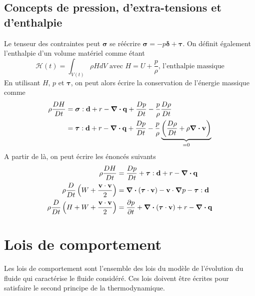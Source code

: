 \documentclass[a4paper,11pt]{report}
\newcommand{\bs}[1]{\boldsymbol{#1}}
\newcommand{\dvm}[2]{\frac{D #1}{D #2}}
\begin{document}
      \subsection{Concepts de pression, d'extra-tensions et d'enthalpie}
        Le tenseur des contraintes peut $\bs{\sigma}$ se réécrire $\bs{\sigma} = -p \bs{\delta} + \bs{\tau}$. On définit également l'enthalpie d'un volume matériel comme étant
        \begin{equation}
          \mathcal{H}(t) = \int_{V(t)} \rho H dV \textrm{ avec } H = U + \frac{p}{\rho}\textrm{, l'enthalpie massique}
        \end{equation}
        En utilisant $H$, $p$ et $\bs{\tau}$, on peut alors écrire la conservation de l'énergie massique comme
        \begin{align}
          \rho \dvm{H}{t} &= \bs{\sigma} : \vb{d} + r - \div \vb{q} +  \dvm{p}{t} - \frac{p}{\rho}\dvm{\rho}{t}\nonumber\\
          &= \bs{\tau} : \vb{d} + r - \div \vb{q} + \dvm{p}{t} - \frac{p}{\rho} \underbrace{\left(\dvm{\rho}{t} + \rho \div \vb{v} \right)}_{=0}
        \end{align}
        A partir de là, on peut écrire les énoncés suivants
        \begin{equation}\begin{aligned}
          \rho \dvm{H}{t} &= \dvm{p}{t} + \bs{\tau} : \vb{d} + r - \div \vb{q}\\
          \rho \dvm{}{t}\left(W + \frac{\vb{v}\cdot\vb{v}}{2}\right) &= \div (\bs{\tau} \cdot \vb{v}) - \vb{v} \cdot \grad p - \bs{\tau} : \vb{d} \\
          \rho \dvm{}{t}\left(H + W + \frac{\vb{v}\cdot\vb{v}}{2}\right) &= \pdv{p}{t} + \div (\bs{\tau} \cdot \vb{v}) + r - \div \vb{q}
        \end{aligned}\end{equation}

    \section{Lois de comportement}
      Les lois de comportement sont l'ensemble des lois du modèle de l'évolution du fluide qui caractérise le fluide considéré. Ces lois doivent être écrites pour satisfaire le second principe de la thermodynamique.
\end{document}
